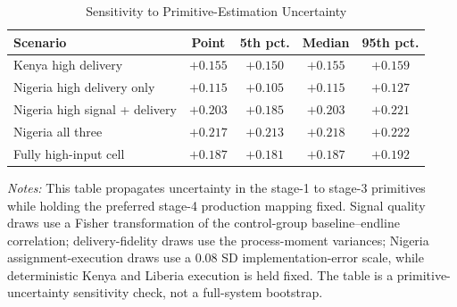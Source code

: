 \begin{table}[H]
\centering
\caption{Sensitivity to Primitive-Estimation Uncertainty}
\label{tab:struct_primitive_uncertainty}
\begin{threeparttable}
\begin{tabular}[t]{lcccc}
\toprule
Scenario & Point & 5th pct. & Median & 95th pct. \\
\midrule
Kenya high delivery & $+0.155$ & $+0.150$ & $+0.155$ & $+0.159$ \\
Nigeria high delivery only & $+0.115$ & $+0.105$ & $+0.115$ & $+0.127$ \\
Nigeria high signal + delivery & $+0.203$ & $+0.185$ & $+0.203$ & $+0.221$ \\
Nigeria all three & $+0.217$ & $+0.213$ & $+0.218$ & $+0.222$ \\
Fully high-input cell & $+0.187$ & $+0.181$ & $+0.187$ & $+0.192$ \\
\bottomrule
\end{tabular}
\begin{tablenotes}
\footnotesize
\item \textit{Notes:} This table propagates uncertainty in the stage-1 to stage-3 primitives while holding the preferred stage-4 production mapping fixed. Signal quality draws use a Fisher transformation of the control-group baseline--endline correlation; delivery-fidelity draws use the process-moment variances; Nigeria assignment-execution draws use a 0.08 SD implementation-error scale, while deterministic Kenya and Liberia execution is held fixed. The table is a primitive-uncertainty sensitivity check, not a full-system bootstrap.
\end{tablenotes}
\end{threeparttable}
\end{table}
